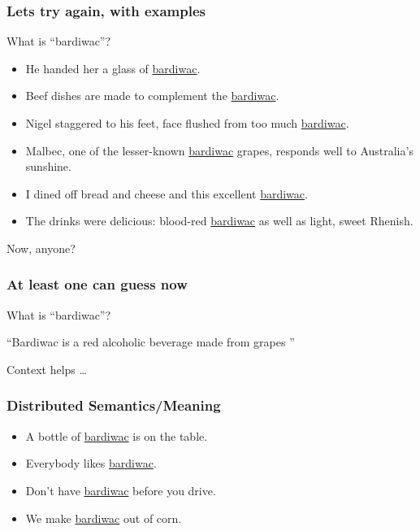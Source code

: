 \begin{frame}[fragile]\frametitle{Lets try again, with examples}
What is ``bardiwac''?

\begin{itemize}
\item He handed her a glass of \underline{bardiwac}. 
\item Beef dishes are made to complement the \underline{bardiwac}.
\item Nigel staggered to his feet, face flushed from too much
\underline{bardiwac}. 
\item Malbec, one of the lesser-known \underline{bardiwac} grapes,
responds well to Australia’s sunshine. 
\item I dined off bread and cheese and this excellent \underline{bardiwac}. 
\item The drinks were delicious: blood-red \underline{bardiwac} as well as 
light, sweet Rhenish. 
\end{itemize}

Now, anyone?
\end{frame}

\begin{frame}[fragile]\frametitle{At least one can guess now}
What is ``bardiwac''?

``Bardiwac is a red 
alcoholic beverage 
made from grapes ''

Context helps \ldots
\end{frame}

\begin{frame}[fragile]\frametitle{Distributed Semantics/Meaning}
\begin{itemize}
\item  A bottle of \underline{bardiwac} is on the table. 
\item  Everybody likes \underline{bardiwac}.
\item  Don’t have \underline{bardiwac} before you drive. 
\item  We make \underline{bardiwac}  out of corn. 

\end{itemize}
\end{frame}

